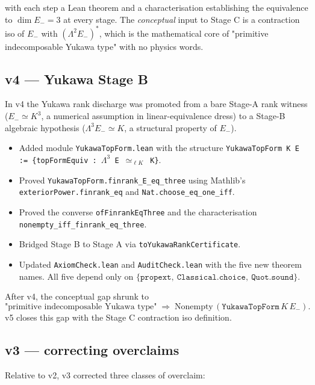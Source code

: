 with each step a Lean theorem and a characterisation establishing
the equivalence to $\dim E_- = 3$ at every stage. The
\emph{conceptual} input to Stage C is a contraction iso of $E_-$
with $(\Lambda^2 E_-)^*$, which is the mathematical core of
"primitive indecomposable Yukawa type" with no physics words.

\subsection*{v4 --- Yukawa Stage B}

In v4 the Yukawa rank discharge was promoted from a bare Stage-A
rank witness ($E_- \simeq K^3$, a numerical assumption in
linear-equivalence dress) to a Stage-B algebraic hypothesis
($\Lambda^3 E_- \simeq K$, a structural property of $E_-$).

\begin{itemize}[leftmargin=1.6em, itemsep=2pt]
\item Added module \texttt{YukawaTopForm.lean} with the structure
    \texttt{YukawaTopForm K E := \{topFormEquiv : $\Lambda^3$ E
    $\simeq_{\ell K}$ K\}}.
\item Proved \texttt{YukawaTopForm.finrank\_E\_eq\_three} using
    Mathlib's \texttt{exteriorPower.finrank\_eq} and
    \texttt{Nat.choose\_eq\_one\_iff}.
\item Proved the converse \texttt{ofFinrankEqThree} and the
    characterisation \texttt{nonempty\_iff\_finrank\_eq\_three}.
\item Bridged Stage B to Stage A via
    \texttt{toYukawaRankCertificate}.
\item Updated \texttt{AxiomCheck.lean} and \texttt{AuditCheck.lean}
    with the five new theorem names. All five depend only on
    $\{\texttt{propext},\ \texttt{Classical.choice},\
    \texttt{Quot.sound}\}$.
\end{itemize}

After v4, the conceptual gap shrunk to
\[
\text{"primitive indecomposable Yukawa type"}
\;\Longrightarrow\;
\text{Nonempty}\,(\texttt{YukawaTopForm}\,K\,E_-).
\]
v5 closes this gap with the Stage C contraction iso definition.

\subsection*{v3 --- correcting overclaims}

Relative to v2, v3 corrected three classes of overclaim:

